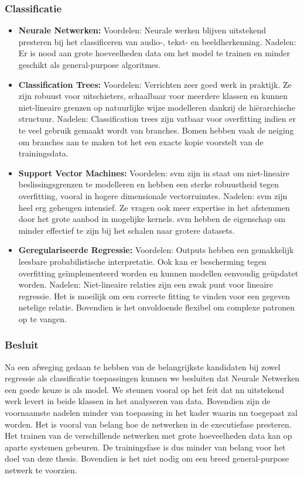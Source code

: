 	\subsubsection{Classificatie}
	
	\begin{itemize}
		\item \textbf{Neurale Netwerken:}
			\subitem Voordelen: Neurale werken blijven uitstekend presteren bij het classificeren van audio-, tekst- en beeldherkenning.
			\subitem Nadelen: Er is nood aan grote hoeveelheden data om het model te trainen en minder geschikt als general-purpose algoritmes.
		\item \textbf{Classification Trees:}
			\subitem Voordelen: Verrichten zeer goed werk in praktijk. Ze zijn robuust voor uitschieters, schaalbaar voor meerdere klassen en kunnen niet-lineaire grenzen op natuurlijke wijze modelleren dankzij de hi\"erarchische structuur.
			\subitem Nadelen: Classification trees zijn vatbaar voor overfitting indien er te veel gebruik gemaakt wordt van branches. Bomen hebben vaak de neiging om branches aan te maken tot het een exacte kopie voorstelt van de trainingsdata.
		\item \textbf{Support Vector Machines:}
			\subitem Voordelen: \gls{svm} zijn in staat om niet-lineaire beslissingsgrenzen te modelleren en hebben een sterke robuustheid tegen overfitting, vooral in hogere dimensionale vectorruimtes.
			\subitem Nadelen: \gls{svm} zijn heel erg geheugen intensief. Ze vragen ook meer expertise in het afstemmen door het grote aanbod in mogelijke kernels. \gls{svm} hebben de eigenschap om minder effectief te zijn bij het schalen naar grotere datasets. 
		\item \textbf{Geregulariseerde Regressie:}		
			\subitem Voordelen: Outputs hebben een  gemakkelijk leesbare probabilistische interpretatie. Ook kan er bescherming tegen overfitting ge\"implementeerd worden en kunnen modellen eenvoudig ge\"updatet worden.
			\subitem Nadelen: Niet-lineaire relaties zijn een zwak punt voor lineaire regressie. Het is moeilijk om een correcte fitting te vinden voor een gegeven netelige relatie. Bovendien is het onvoldoende flexibel om complexe patronen op te vangen.

			
	\end{itemize}

	\subsubsection{Besluit}
	Na een afweging gedaan te hebben van de belangrijkste kandidaten bij zowel regressie als classificatie toepassingen kunnen we besluiten dat Neurale Netwerken een goede keuze is als model. We steunen vooral op het feit dat \gls{nn} uitstekend werk levert in beide klassen in het analyseren van data. Bovendien zijn de voornaamste nadelen minder van toepassing in het kader waarin \gls{nn} toegepast zal worden. Het is vooral van belang hoe de netwerken in de executiefase presteren. Het trainen van de verschillende netwerken met grote hoeveelheden data kan op aparte systemen gebeuren. De trainingsfase is dus minder van belang voor het doel van deze thesis. Bovendien is het niet nodig om een breed general-purpose netwerk te voorzien.
	

